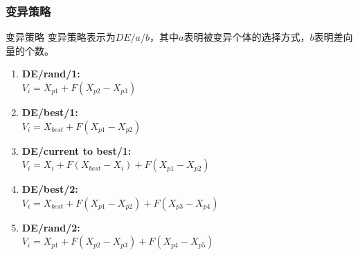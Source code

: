 \subsubsection{变异策略}
\begin{frame}{变异策略}
	变异策略表示为$DE/a/b$，其中$a$表明被变异个体的选择方式，$b$表明差向量的个数。
		\begin{enumerate}
		\item {\bf DE/rand/1:}\\\qquad$V_i = X_{p1}+F\left(X_{p2}-X_{p3}\right)$
		\item {\bf DE/best/1:}\\\qquad$V_i = X_{best}+F\left(X_{p1}-X_{p2}\right)$
		\item {\bf DE/current to best/1:}\\\qquad$V_i = X_{i}+F\left(X_{best}-X_{i}\right)+F\left(X_{p1}-X_{p2}\right)$
		\item {\bf DE/best/2:}\\\qquad$V_i=X_{best}+F\left(X_{p1}-X_{p2}\right)+F\left(X_{p3}-X_{p4}\right)$
		\item {\bf DE/rand/2:}\\\qquad$V_i = X_{p1}+F\left(X_{p2}-X_{p3}\right)+F\left(X_{p4}-X_{p5}\right)$
	\end{enumerate}
\end{frame}

% 